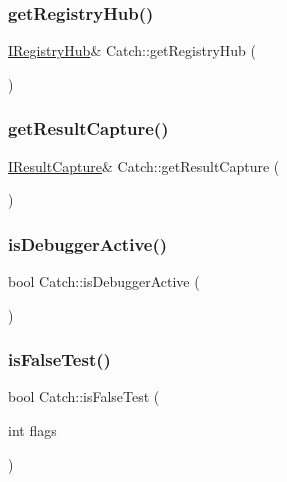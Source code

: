 \subsubsection{\texorpdfstring{get\+Registry\+Hub()}{getRegistryHub()}}
{\footnotesize\ttfamily \mbox{\hyperlink{struct_catch_1_1_i_registry_hub}{I\+Registry\+Hub}}\& Catch\+::get\+Registry\+Hub (\begin{DoxyParamCaption}{ }\end{DoxyParamCaption})}

\mbox{\label{namespace_catch_aff60c1de6ac6cea30175d70e33d83c8e}} 
\subsubsection{\texorpdfstring{get\+Result\+Capture()}{getResultCapture()}}
{\footnotesize\ttfamily \mbox{\hyperlink{struct_catch_1_1_i_result_capture}{I\+Result\+Capture}}\& Catch\+::get\+Result\+Capture (\begin{DoxyParamCaption}{ }\end{DoxyParamCaption})}

\mbox{\label{namespace_catch_ab079497368fb1df25af39ad494d2a241}} 
\subsubsection{\texorpdfstring{is\+Debugger\+Active()}{isDebuggerActive()}}
{\footnotesize\ttfamily bool Catch\+::is\+Debugger\+Active (\begin{DoxyParamCaption}{ }\end{DoxyParamCaption})}

\mbox{\label{namespace_catch_a93ef4e3e307a2021ca0d41b32c0e54b0}} 
\subsubsection{\texorpdfstring{is\+False\+Test()}{isFalseTest()}}
{\footnotesize\ttfamily bool Catch\+::is\+False\+Test (\begin{DoxyParamCaption}\item[{int}]{flags }\end{DoxyParamCaption})\hspace{0.3cm}{\ttfamily [inline]}}

